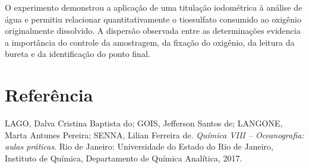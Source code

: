 \documentclass[a4paper,12pt]{article}
\begin{document}
O experimento demonstrou a aplicação de uma titulação iodométrica à análise
de água e permitiu relacionar quantitativamente o tiossulfato consumido ao
oxigênio originalmente dissolvido. A dispersão observada entre as
determinações evidencia a importância do controle da amostragem, da fixação
do oxigênio, da leitura da bureta e da identificação do ponto final.

\section*{Referência}

LAGO, Dalva Cristina Baptista do; GOIS, Jefferson Santos de; LANGONE,
Marta Antunes Pereira; SENNA, Lilian Ferreira de.
\textit{Química VIII -- Oceanografia: aulas práticas}.
Rio de Janeiro: Universidade do Estado do Rio de Janeiro,
Instituto de Química, Departamento de Química Analítica, 2017.
\end{document}
